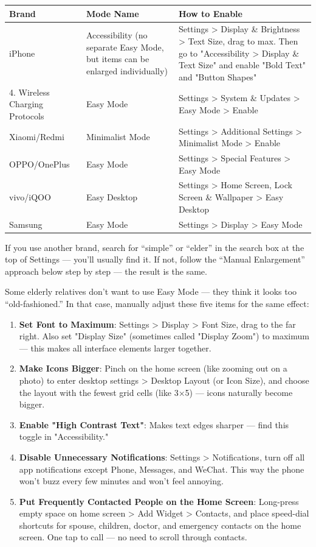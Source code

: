
\begin{center}
\begin{tabularx}{\linewidth}{|X|X|X|}
\hline
\textbf{Brand} & \textbf{Mode Name} & \textbf{How to Enable} \tabularnewline
\hline
iPhone & Accessibility (no separate Easy Mode, but items can be enlarged individually) & Settings > Display \& Brightness > Text Size, drag to max. Then go to "Accessibility > Display \& Text Size" and enable "Bold Text" and "Button Shapes" \tabularnewline
4. Wireless Charging Protocols & Easy Mode & Settings > System \& Updates > Easy Mode > Enable \tabularnewline
Xiaomi/Redmi & Minimalist Mode & Settings > Additional Settings > Minimalist Mode > Enable \tabularnewline
OPPO/OnePlus & Easy Mode & Settings > Special Features > Easy Mode \tabularnewline
vivo/iQOO & Easy Desktop & Settings > Home Screen, Lock Screen \& Wallpaper > Easy Desktop \tabularnewline
Samsung & Easy Mode & Settings > Display > Easy Mode \tabularnewline
\hline
\end{tabularx}
\end{center}

If you use another brand, search for “simple” or “elder” in the search box at the top of Settings — you'll usually find it. If not, follow the “Manual Enlargement” approach below step by step — the result is the same.


Some elderly relatives don't want to use Easy Mode — they think it looks too “old-fashioned.” In that case, manually adjust these five items for the same effect:

\begin{enumerate}
  \item \textbf{Set Font to Maximum}: Settings > Display > Font Size, drag to the far right. Also set "Display Size" (sometimes called "Display Zoom") to maximum — this makes all interface elements larger together.
  \item \textbf{Make Icons Bigger}: Pinch on the home screen (like zooming out on a photo) to enter desktop settings > Desktop Layout (or Icon Size), and choose the layout with the fewest grid cells (like 3×5) — icons naturally become bigger.
  \item \textbf{Enable "High Contrast Text"}: Makes text edges sharper — find this toggle in "Accessibility."
  \item \textbf{Disable Unnecessary Notifications}: Settings > Notifications, turn off all app notifications except Phone, Messages, and WeChat. This way the phone won't buzz every few minutes and won't feel annoying.
  \item \textbf{Put Frequently Contacted People on the Home Screen}: Long-press empty space on home screen > Add Widget > Contacts, and place speed-dial shortcuts for spouse, children, doctor, and emergency contacts on the home screen. One tap to call — no need to scroll through contacts.
\end{enumerate}

